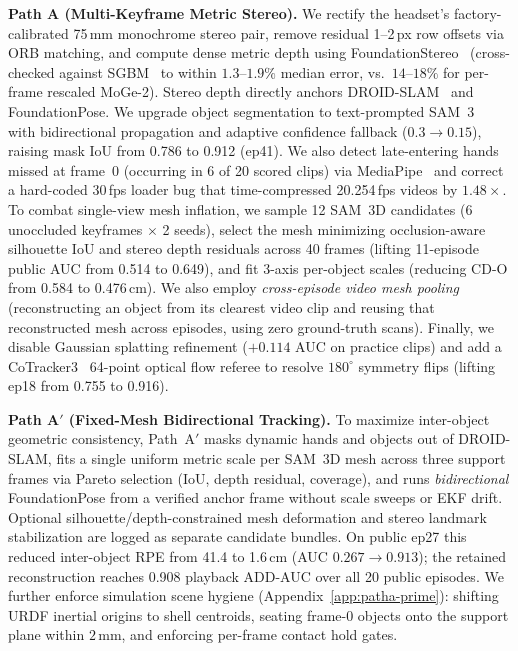 \documentclass[10pt]{nvidiaextabstract}
\begin{document}
\textbf{Path A (Multi-Keyframe Metric Stereo).} We rectify the headset's factory-calibrated 75\,mm monochrome stereo pair, remove residual 1--2\,px row offsets via ORB matching, and compute dense metric depth using FoundationStereo~\cite{wen2025foundationstereo} (cross-checked against SGBM~\cite{hirschmuller2008sgm} to within $1.3$--$1.9\%$ median error, vs.\ $14$--$18\%$ for per-frame rescaled MoGe-2). Stereo depth directly anchors DROID-SLAM~\cite{teed2021droid} and FoundationPose. We upgrade object segmentation to text-prompted SAM~3~\cite{carion2025sam3} with bidirectional propagation and adaptive confidence fallback ($0.3 \rightarrow 0.15$), raising mask IoU from 0.786 to 0.912 (ep41). We also detect late-entering hands missed at frame~0 (occurring in 6 of 20 scored clips) via MediaPipe~\cite{zhang2020mediapipehands} and correct a hard-coded 30\,fps loader bug that time-compressed 20.254\,fps videos by $1.48\times$. To combat single-view mesh inflation, we sample 12 SAM~3D candidates (6 unoccluded keyframes $\times$ 2 seeds), select the mesh minimizing occlusion-aware silhouette IoU and stereo depth residuals across 40 frames (lifting 11-episode public AUC from 0.514 to 0.649), and fit 3-axis per-object scales (reducing CD-O from 0.584 to 0.476\,cm). We also employ \emph{cross-episode video mesh pooling} (reconstructing an object from its clearest video clip and reusing that reconstructed mesh across episodes, using zero ground-truth scans). Finally, we disable Gaussian splatting refinement ($+0.114$ AUC on practice clips) and add a CoTracker3~\cite{karaev2025cotracker3} 64-point optical flow referee to resolve $180^\circ$ symmetry flips (lifting ep18 from 0.755 to 0.916).

\textbf{Path A$'$ (Fixed-Mesh Bidirectional Tracking).} To maximize inter-object geometric consistency, Path~A$'$ masks dynamic hands and objects out of DROID-SLAM, fits a single uniform metric scale per SAM~3D mesh across three support frames via Pareto selection (IoU, depth residual, coverage), and runs \emph{bidirectional} FoundationPose from a verified anchor frame without scale sweeps or EKF drift. Optional silhouette/depth-constrained mesh deformation and stereo landmark stabilization are logged as separate candidate bundles. On public ep27 this reduced inter-object RPE from 41.4 to 1.6\,cm (AUC $0.267 \rightarrow 0.913$); the retained reconstruction reaches 0.908 playback ADD-AUC over all 20 public episodes. We further enforce simulation scene hygiene (Appendix~\ref{app:patha-prime}): shifting URDF inertial origins to shell centroids, seating frame-0 objects onto the support plane within $2$\,mm, and enforcing per-frame contact hold gates.
\end{document}
